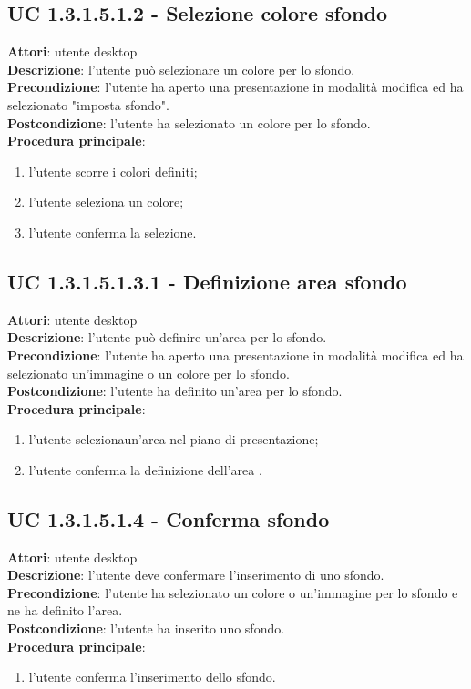 \subsection{UC 1.3.1.5.1.2 - Selezione colore sfondo}{
	\label{uc1.3.1.5.1.2}
	\textbf{Attori}: utente desktop \\
	\textbf{Descrizione}: l'utente può selezionare un colore per lo sfondo. \\
	\textbf{Precondizione}: l'utente ha aperto una presentazione in modalità modifica ed ha selezionato "imposta sfondo".	\\
	\textbf{Postcondizione}: l'utente ha selezionato un colore per lo sfondo.	\\
	\textbf{Procedura principale}:
	\begin{enumerate}
		\item l'utente scorre i colori definiti;
		\item l'utente seleziona un colore;
		\item l'utente conferma la selezione.
	\end{enumerate}
}
\subsection{UC 1.3.1.5.1.3.1 - Definizione area sfondo}{
	\label{uc1.3.1.5.1.3.1}
	\textbf{Attori}: utente desktop \\
	\textbf{Descrizione}: l'utente può definire un'area per lo sfondo. \\
	\textbf{Precondizione}: l'utente ha aperto una presentazione in modalità modifica ed ha selezionato un'immagine o un colore per lo sfondo.	\\
	\textbf{Postcondizione}: l'utente ha definito un'area per lo sfondo.	\\
	\textbf{Procedura principale}:
	\begin{enumerate}
		\item l'utente selezionaun'area nel piano di presentazione;
		\item l'utente conferma la definizione dell'area .
	\end{enumerate}
}

\subsection{UC 1.3.1.5.1.4 - Conferma sfondo}{
	\label{uc1.3.1.5.1.4}
	\textbf{Attori}: utente desktop \\
	\textbf{Descrizione}: l'utente deve confermare l'inserimento di uno sfondo. \\
	\textbf{Precondizione}: l'utente ha selezionato un colore o un'immagine per lo sfondo e ne ha definito l'area.	\\
	\textbf{Postcondizione}: l'utente ha inserito uno sfondo.	\\
	\textbf{Procedura principale}:
	\begin{enumerate}
		\item l'utente conferma l'inserimento dello sfondo.
	\end{enumerate}
}

